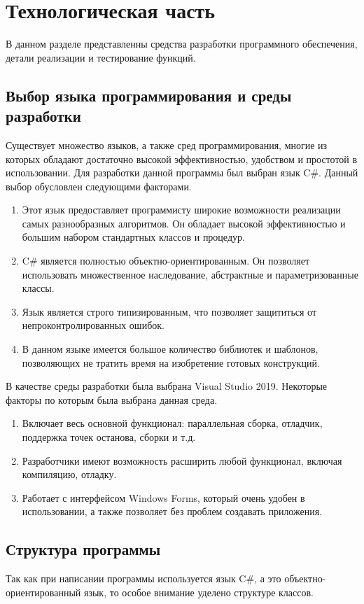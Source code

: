 \chapter{Технологическая часть}

В данном разделе представленны средства разработки программного обеспечения, детали реализации и тестирование функций.

\section{Выбор языка программирования и среды разработки}
Существует множество языков, а также сред программирования, многие из которых обладают достаточно высокой эффективностью, удобством и простотой в использовании. Для разработки данной программы был выбран язык C\#. Данный выбор обусловлен следующими факторами.

\begin{enumerate}
	\item Этот язык предоставляет программисту широкие возможности реализации самых разнообразных алгоритмов. Он обладает высокой эффективностью и большим набором стандартных классов и процедур.
	\item C\# является полностью объектно-ориентированным. Он позволяет использовать множественное наследование, абстрактные и параметризованные классы.
	\item Язык является строго типизированным, что позволяет защититься от непроконтролированных ошибок.
	\item В данном языке имеется большое количество библиотек и шаблонов, позволяющих не тратить время на изобретение готовых конструкций.
\end{enumerate}

В качестве среды разработки была выбрана Visual Studio 2019. Некоторые факторы по которым была выбрана данная среда.
\begin{enumerate}
	\item Включает весь основной функционал: параллельная сборка, отладчик, поддержка точек останова, сборки и т.д.
	\item Разработчики имеют возможность расширить любой функционал, включая компиляцию, отладку.
	\item Работает с интерфейсом Windows Forms, который очень удобен в использовании, а также позволяет без проблем создавать приложения.
\end{enumerate}

\section{Структура программы}
Так как при написании программы используется язык C\#, а это объектно-ориентированный язык, то особое внимание уделено структуре классов.

